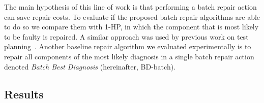 \documentclass[letterpaper]{article}
\newcommand\meir[1]{\textcolor{red}{meir: #1}}
\begin{document}
The main hypothesis of this line of work is that performing a batch repair action can save repair costs. To evaluate if the proposed batch repair algorithms are able to do so we compare them with 1-HP, in which the component that is most likely to be faulty is repaired. A similar approach was used by previous work on test planning~\cite{zamir2014using}. Another baseline repair algorithm we evaluated experimentally is to repair all components of the most likely diagnosis in a single batch repair action denoted {\em Batch Best Diagnosis} (hereinafter, BD-batch).




\subsection{Results}
\end{document}
